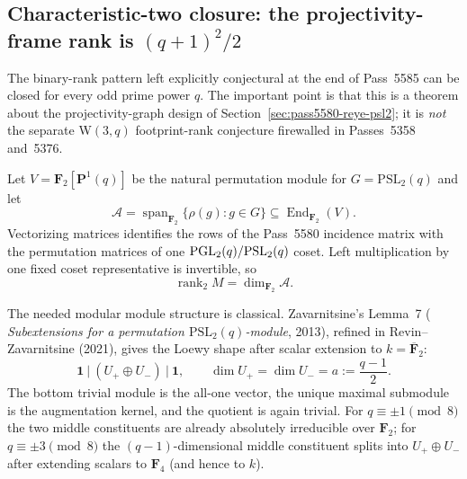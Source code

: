 \subsection{Characteristic-two closure: the projectivity-frame rank is $(q+1)^2/2$}
\label{sec:pass5586-binary-psl2-span}

The binary-rank pattern left explicitly conjectural at the end of
Pass~5585 can be closed for every odd prime power $q$.  The important point is
that this is a theorem about the projectivity-graph design of
Section~\ref{sec:pass5580-reye-psl2}; it is \emph{not} the separate W$(3,q)$
footprint-rank conjecture firewalled in Passes~5358 and~5376.

Let $V=\mathbf F_2[\mathbf P^1(q)]$ be the natural permutation module for
$G=\mathrm{PSL}_2(q)$ and let
\[
 \mathcal A=\operatorname{span}_{\mathbf F_2}\{\rho(g):g\in G\}
 \subseteq\operatorname{End}_{\mathbf F_2}(V).
\]
Vectorizing matrices identifies the rows of the Pass~5580 incidence matrix
with the permutation matrices of one $\mathrm{PGL}_2(q)/\mathrm{PSL}_2(q)$ coset.  Left
multiplication by one fixed coset representative is invertible, so
\[
 \operatorname{rank}_2 M=\dim_{\mathbf F_2}\mathcal A.
\]

The needed modular module structure is classical.  Zavarnitsine's Lemma~7
(
\emph{Subextensions for a permutation $\mathrm{PSL}_2(q)$-module}, 2013), refined in
Revin--Zavarnitsine (2021), gives the Loewy shape after scalar extension to
$k=\overline{\mathbf F}_2$:
\[
 \boxed{
 \mathbf 1\ \big|\ (U_+\oplus U_-)\ \big|\ \mathbf 1,
 \qquad
 \dim U_+=\dim U_-=a:=\frac{q-1}{2}.
 }
\]
The bottom trivial module is the all-one vector, the unique maximal submodule
is the augmentation kernel, and the quotient is again trivial.  For
$q\equiv\pm1\pmod8$ the two middle constituents are already absolutely
irreducible over $\mathbf F_2$; for $q\equiv\pm3\pmod8$ the $(q-1)$-dimensional
middle constituent splits into $U_+\oplus U_-$ after extending scalars to
$\mathbf F_4$ (and hence to $k$).


